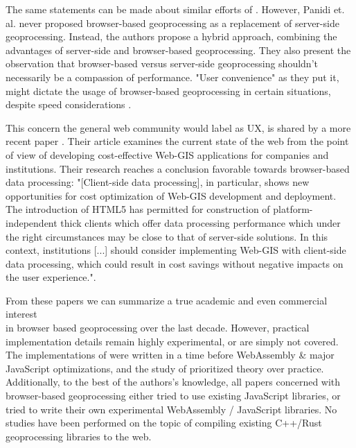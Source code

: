 The same statements can be made about similar efforts of \citet{panidi_hybrid_2015}. 
However, Panidi et. al. never proposed browser-based geoprocessing as a replacement of server-side geoprocessing. 
Instead, the authors propose a hybrid approach, combining the advantages of server-side and browser-based geoprocessing. 
They also present the observation that browser-based versus server-side geoprocessing shouldn't necessarily be a compassion of performance. 
"User convenience" as they put it, might dictate the usage of browser-based geoprocessing in certain situations, despite speed considerations \cite{panidi_hybrid_2015}. 

This concern the general web community would label as \ac{UX}, is shared by a more recent paper \cite{kulawiak_analysis_2019}. 
Their article examines the current state of the web from the point of view of developing cost-effective Web-GIS applications for companies and institutions. 
Their research reaches a conclusion favorable towards browser-based data processing: "[Client-side data processing], in particular, shows new opportunities for cost optimization of Web-GIS development and deployment. 
The introduction of HTML5 has permitted for construction of platform-independent thick clients which offer data processing performance which under the right circumstances may be close to that of server-side solutions. 
In this context, institutions [...] should consider implementing Web-GIS with client-side data processing, which could result in cost savings without negative impacts on the user experience.".


From these papers we can summarize a true academic and even commercial interest \\ in browser based geoprocessing over the last decade. 
However, practical implementation details remain highly experimental, or are simply not covered.  
The implementations of \cite{panidi_hybrid_2015, hamilton_client-side_2014} were written in a time before WebAssembly \& major JavaScript optimizations, and the study of \cite{kulawiak_analysis_2019} prioritized theory over practice. 
Additionally, to the best of the authors's knowledge, all papers concerned with browser-based geoprocessing either tried to use existing JavaScript libraries, or tried to write their own experimental WebAssembly / JavaScript libraries. 
No studies have been performed on the topic of compiling existing C++/Rust geoprocessing libraries to the web. 

